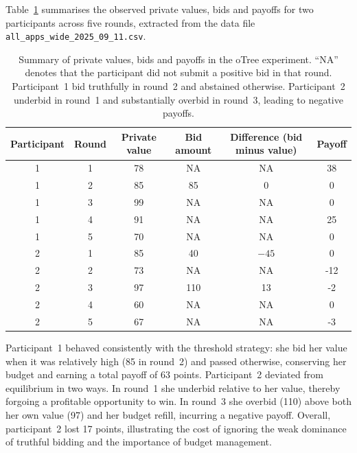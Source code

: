 Table~\ref{tab:data} summarises the observed private values, bids and payoffs for two participants across five rounds, extracted from the data file \texttt{all\_apps\_wide\_2025\_09\_11.csv}.

\begin{table}[H]
    \centering
    \caption{Summary of private values, bids and payoffs in the oTree experiment.  ``NA'' denotes that the participant did not submit a positive bid in that round.  Participant~1 bid truthfully in round~2 and abstained otherwise.  Participant~2 underbid in round~1 and substantially overbid in round~3, leading to negative payoffs.}
    \label{tab:data}
    \begin{tabular}{cccccc}
        \toprule
        \textbf{Participant} & \textbf{Round} & \textbf{Private value} & \textbf{Bid amount} & \textbf{Difference (bid minus value)} & \textbf{Payoff}\\
        \midrule
        1 & 1 & 78 & NA & NA & 38\\
        1 & 2 & 85 & 85 & 0 & 0\\
        1 & 3 & 99 & NA & NA & 0\\
        1 & 4 & 91 & NA & NA & 25\\
        1 & 5 & 70 & NA & NA & 0\\
        \midrule
        2 & 1 & 85 & 40 & \(-45\) & 0\\
        2 & 2 & 73 & NA & NA & -12\\
        2 & 3 & 97 & 110 & 13 & -2\\
        2 & 4 & 60 & NA & NA & 0\\
        2 & 5 & 67 & NA & NA & -3\\
        \bottomrule
    \end{tabular}
\end{table}

Participant~1 behaved consistently with the threshold strategy: she bid her value when it was relatively high (85 in round~2) and passed otherwise, conserving her budget and earning a total payoff of 63 points.  Participant~2 deviated from equilibrium in two ways.  In round~1 she underbid relative to her value, thereby forgoing a profitable opportunity to win.  In round~3 she overbid (110) above both her own value (97) and her budget refill, incurring a negative payoff.  Overall, participant~2 lost 17 points, illustrating the cost of ignoring the weak dominance of truthful bidding and the importance of budget management.

